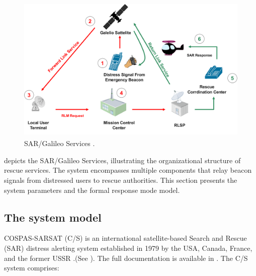 
\begin{figure}[htbp]
     \centering
     		\includegraphics[width=320pt, height =200pt]{cs.pdf}
     \caption{SAR/Galileo Services \cite{galileoperformances,galileoossdd}.}
     \label{fig:usecase}
 \end{figure} 

 depicts the SAR/Galileo Services, illustrating the organizational structure of rescue services. The system encompasses multiple components that relay beacon signals from distressed users to rescue authorities. This section presents the system parameters and the formal response mode model.

\subsection{The system model}


COSPAS-SARSAT (C/S) is an international satellite-based Search and Rescue (SAR) distress alerting system established in 1979 by the USA, Canada, France, and the former USSR \cite{galileosarservice}.(See ). The full documentation is available in \cite{galileosarsdd}. The C/S system comprises:

